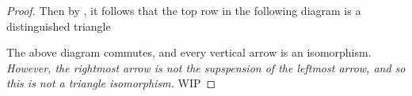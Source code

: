 \begin{proof}
    Then by \cite[Chapter 1, Subsection 1.3, Lemma]{Happel_1988}, it follows that the top row in the following diagram is a distinguished triangle

    \begin{center}
    \end{center}
    The above diagram commutes, and every vertical arrow is an isomorphism. \emph{However, the rightmost arrow is not the supspension of the leftmost arrow, and so this is not a triangle isomorphism.} WIP
\end{proof}
